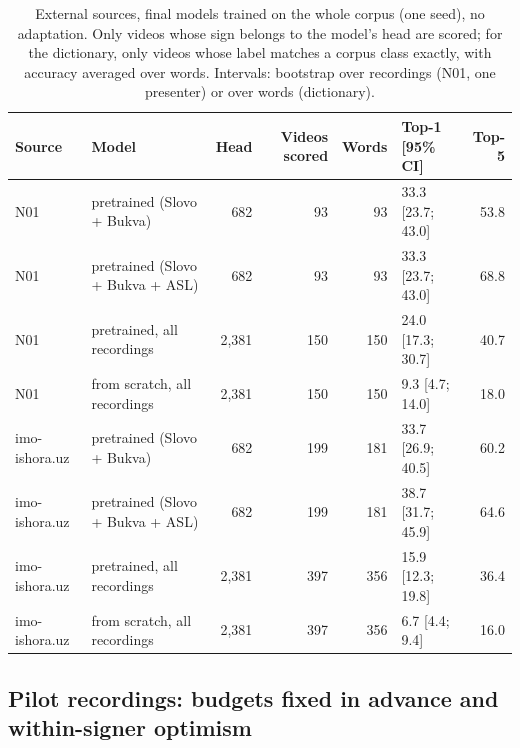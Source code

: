 \begin{table}[t]
\caption{External sources, final models trained on the whole corpus (one seed), no adaptation. Only videos whose sign belongs to the model's head are scored; for the dictionary, only videos whose label matches a corpus class exactly, with accuracy averaged over words. Intervals: bootstrap over recordings (N01, one presenter) or over words (dictionary).}\label{tab:external}
\footnotesize
\centering
\begin{tabular}{llrrrlr}
\toprule
\textbf{Source} & \textbf{Model} & \textbf{Head} & \textbf{Videos scored} & \textbf{Words} & \textbf{Top-1 [95\% CI]} & \textbf{Top-5} \\
\midrule
N01 & pretrained (Slovo + Bukva) & 682 & 93 & 93 & 33.3 [23.7; 43.0] & 53.8 \\
N01 & pretrained (Slovo + Bukva + ASL) & 682 & 93 & 93 & 33.3 [23.7; 43.0] & 68.8 \\
N01 & pretrained, all recordings & 2,381 & 150 & 150 & 24.0 [17.3; 30.7] & 40.7 \\
N01 & from scratch, all recordings & 2,381 & 150 & 150 & 9.3 [4.7; 14.0] & 18.0 \\
imo-ishora.uz & pretrained (Slovo + Bukva) & 682 & 199 & 181 & 33.7 [26.9; 40.5] & 60.2 \\
imo-ishora.uz & pretrained (Slovo + Bukva + ASL) & 682 & 199 & 181 & 38.7 [31.7; 45.9] & 64.6 \\
imo-ishora.uz & pretrained, all recordings & 2,381 & 397 & 356 & 15.9 [12.3; 19.8] & 36.4 \\
imo-ishora.uz & from scratch, all recordings & 2,381 & 397 & 356 & 6.7 [4.4; 9.4] & 16.0 \\
\bottomrule
\end{tabular}
\end{table}

\hypertarget{pilot-recordings-budgets-fixed-in-advance-and-within-signer-optimism}{%
\subsection{Pilot recordings: budgets fixed in advance and within-signer optimism}\label{pilot-recordings-budgets-fixed-in-advance-and-within-signer-optimism}}

